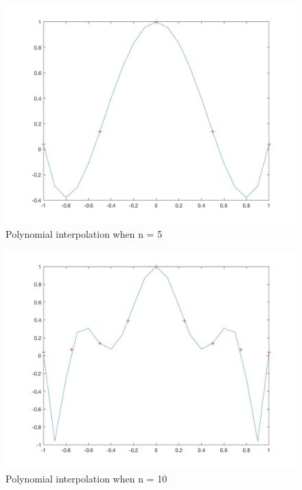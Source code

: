 \documentclass{article}
\begin{document}

\begin{figure}[H]
\centering
\caption{Polynomial interpolation when n = 5}
\includegraphics[scale=0.4]{Problem_3_n=5}
\end{figure}

\begin{figure}[H]
\centering
\caption{Polynomial interpolation when n = 10}
\includegraphics[scale=0.4]{Problem_3_n=10}
\end{figure}
\end{document}

